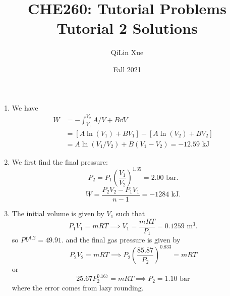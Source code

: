 \documentclass{article}
\title{CHE260: Tutorial Problems \\ \textbf{Tutorial 2 Solutions}}
\author{QiLin Xue}
\date{Fall 2021}
\begin{document}
\maketitle
\begin{enumerate}
    \item We have 
    \begin{align}
        W &= -\int_{V_1}^{V_2} A/V+B \dd{V} \\ 
        &= \left[A\ln(V_1)+BV_1\right] - \left[A\ln(V_2)+BV_2\right]  \\ 
        &= A\ln(V_1/V_2) + B(V_1-V_2) = -12.59\text{ kJ}
    \end{align}
    \item We first find the final pressure: 
    \begin{equation}
        P_2 = P_1\left(\frac{V_1}{V_2}\right)^{1.35} = 2.00\text{ bar.}
    \end{equation}
    \begin{equation}
        W = \frac{P_2V_2-P_1V_1}{n-1} = -1284\text{ kJ.}
    \end{equation}
    \item The initial volume is given by $V_1$ such that 
    \begin{equation}
        P_1V_1 = mRT \implies V_1 = \frac{mRT}{P_1} = 0.1259 \text{ m}^3. 
    \end{equation}
    so $PV^{1.2} = 49.91.$ 
    and the final gas pressure is given by 
    \begin{equation}
        P_2V_2 = mRT \implies P_2\left(\frac{85.87}{P_2}\right)^{0.833} = mRT
    \end{equation}
    or 
    \begin{equation}
        25.67P_2^{0.167}=mRT \implies P_2 = 1.10\text{ bar}
    \end{equation}
    where the error comes from lazy rounding.
\end{enumerate}
\end{document}
